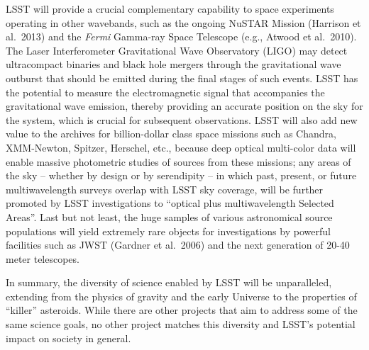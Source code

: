 LSST will provide a crucial complementary capability to space 
experiments operating in other wavebands, such as the ongoing
NuSTAR Mission (Harrison et al.~2013)
and the {\it Fermi} 
Gamma-ray Space Telescope (e.g., Atwood et al.~2010). 
The Laser Interferometer Gravitational 
Wave Observatory (LIGO) may detect ultracompact binaries and black hole mergers through the 
gravitational wave outburst that should be emitted during the final stages of such events. 
LSST has the potential to measure the electromagnetic signal that accompanies the gravitational wave emission, 
thereby providing an accurate position on the sky for the system, which is 
crucial for subsequent observations. LSST will also add new value to the archives for 
billion-dollar class space missions such as Chandra, XMM-Newton, Spitzer, Herschel,
etc., because deep optical multi-color data will enable 
massive photometric  studies of sources from these missions;
any areas of the sky -- whether by design or by serendipity -- in which past, present, or future 
multiwavelength surveys overlap with LSST sky coverage, will be further promoted by LSST 
investigations to ``optical plus multiwavelength Selected Areas''.   
Last but not least, the huge samples of various astronomical source
populations will yield extremely rare objects for investigations by powerful
facilities such as JWST (Gardner et al.~2006) and the next generation
of 20-40 meter telescopes.  

In summary, the diversity of science enabled by LSST will be 
unparalleled, extending from the physics of gravity and the
early Universe to the properties of ``killer'' asteroids. While
there are other projects that aim to address some of the same
science goals, no other project matches this diversity and 
LSST's potential impact on society in general. 

